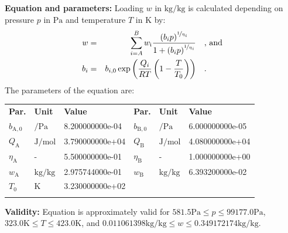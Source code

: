 \textbf{Equation and parameters:}
\newline
%
Loading $w$ in $\si{\kilogram\per\kilogram}$ is calculated depending on pressure $p$ in $\si{\pascal}$ and temperature $T$ in $\si{\kelvin}$ by:
%
\begin{equation*}
\begin{split}
w &=& \sum_{i=A}^{B} w_\mathrm{i} \frac{\left( b_i p \right) ^ {\nicefrac{1}{\eta_i}} }{1 + \left( b_i p \right) ^ {\nicefrac{1}{\eta_i}}} & \quad\text{, and} \\
b_i &=& b_{i,0} \exp \left( \frac{Q_i}{R T} \left( 1 - \frac{T}{T_0} \right) \right) & \quad\text{.}
\end{split}
\end{equation*}
%
The parameters of the equation are:
%
\begin{longtable}[l]{lll|lll}
\toprule
\addlinespace
\textbf{Par.} & \textbf{Unit} & \textbf{Value} &	\textbf{Par.} & \textbf{Unit} & \textbf{Value} \\
\addlinespace
\midrule
\endhead

\bottomrule
\endfoot
\bottomrule
\endlastfoot
\addlinespace

$b_\mathrm{A,0}$ & $\si{\per\pascal}$ & 8.200000000e-04 & $b_\mathrm{B,0}$ & $\si{\per\pascal}$ & 6.000000000e-05 \\
$Q_\mathrm{A}$ & $\si{\joule\per\mole}$ & 3.790000000e+04 & $Q_\mathrm{B}$ & $\si{\joule\per\mole}$ & 4.080000000e+04 \\
$\eta_\mathrm{A}$ & - & 5.500000000e-01 & $\eta_\mathrm{B}$ & - & 1.000000000e+00 \\
$w_\mathrm{A}$ & $\si{\kilogram\per\kilogram}$ & 2.975744000e-01 & $w_\mathrm{B}$ & $\si{\kilogram\per\kilogram}$ & 6.393200000e-02 \\
$T_0$ & $\si{\kelvin}$ & 3.230000000e+02 & & & \\

\addlinespace\end{longtable}

\textbf{Validity:}
\newline
Equation is approximately valid for $581.5 \si{\pascal} \leq p \leq 99177.0 \si{\pascal}$,  $323.0 \si{\kelvin} \leq T \leq 423.0 \si{\kelvin}$, and $0.011061398 \si{\kilogram\per\kilogram} \leq w \leq 0.349172174 \si{\kilogram\per\kilogram}$.
\newline

